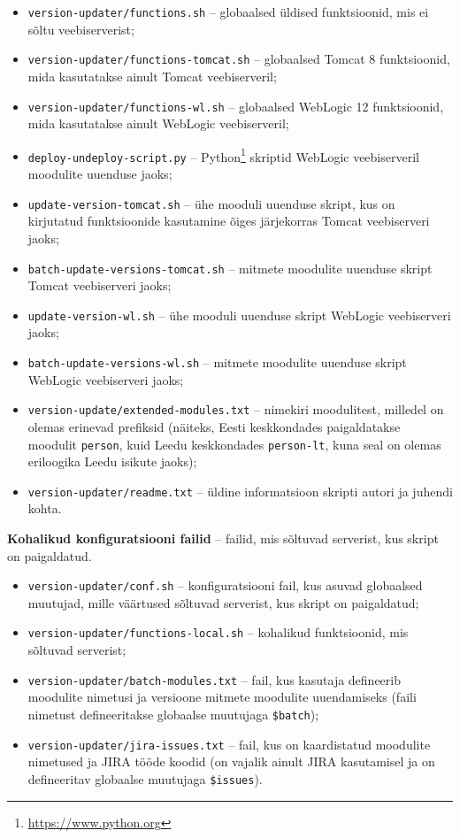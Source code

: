 \documentclass[12pt]{report}
\newcommand{\code}[1]{\texttt{#1}}
\begin{document}
  \begin{itemize}
    \item \code{version-updater/functions.sh} \--- globaalsed üldised funktsioonid, mis ei sõltu veebiserverist;
    \item \code{version-updater/functions-tomcat.sh} \--- globaalsed Tomcat 8 funktsioonid, mida kasutatakse ainult Tomcat veebiserveril;
    \item \code{version-updater/functions-wl.sh} \--- globaalsed WebLogic 12 funktsioonid, mida kasutatakse ainult WebLogic veebiserveril;
    \item \code{deploy-undeploy-script.py} \--- Python\footnote{\url{https://www.python.org}} skriptid WebLogic veebiserveril moodulite uuenduse jaoks;
    \item \code{update-version-tomcat.sh} \--- ühe mooduli uuenduse skript, kus on kirjutatud funktsioonide kasutamine õiges järjekorras Tomcat veebiserveri jaoks;
    \item \code{batch-update-versions-tomcat.sh} \--- mitmete moodulite uuenduse skript Tomcat veebiserveri jaoks;
    \item \code{update-version-wl.sh} \--- ühe mooduli uuenduse skript WebLogic veebiserveri jaoks;
    \item \code{batch-update-versions-wl.sh} \--- mitmete moodulite uuenduse skript WebLogic veebiserveri jaoks;
    \item \code{version-update/extended-modules.txt} \--- nimekiri moodulitest, milledel on olemas erinevad prefiksid (näiteks, Eesti keskkondades paigaldatakse moodulit \code{person}, kuid Leedu keskkondades \code{person-lt}, kuna seal on olemas eriloogika Leedu isikute jaoks);
    \item \code{version-updater/readme.txt} \--- üldine informatsioon skripti autori ja juhendi kohta.
  \end{itemize}
  
  \textbf{Kohalikud konfiguratsiooni failid} \--- failid, mis sõltuvad serverist, kus skript on paigaldatud.
  
  \begin{itemize}
    \item \code{version-updater/conf.sh} \--- konfiguratsiooni fail, kus asuvad globaalsed muutujad, mille väärtused sõltuvad serverist, kus skript on paigaldatud;
    \item \code{version-updater/functions-local.sh} \--- kohalikud funktsioonid, mis sõltuvad serverist;
    \item \code{version-updater/batch-modules.txt} \--- fail, kus kasutaja defineerib moodulite nimetusi ja versioone mitmete moodulite uuendamiseks (faili nimetust defineeritakse globaalse muutujaga \code{\$batch});
    \item \code{version-updater/jira-issues.txt} \--- fail, kus on kaardistatud moodulite nimetused ja JIRA tööde koodid (on vajalik ainult JIRA kasutamisel ja on defineeritav globaalse muutujaga \code{\$issues}).
  \end{itemize}
  
\end{document}
